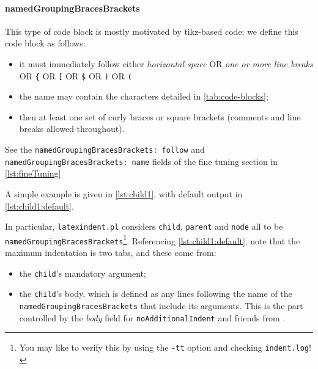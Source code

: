 	\paragraph{namedGroupingBracesBrackets}
		This type of code block is mostly motivated by tikz-based code; we define this code block
		as follows:
		\begin{itemize}
			\item it must immediately follow either \emph{horizontal space} OR \emph{one or more line breaks} OR
			      \lstinline!{! OR \lstinline![! OR \lstinline!$! OR
                  \lstinline!)! OR \lstinline!(!
			\item the name may contain the characters detailed in \vref{tab:code-blocks};
			\item then at least one set of curly braces or square brackets (comments and line breaks
			      allowed throughout).
		\end{itemize}
        See the \texttt{namedGroupingBracesBrackets: follow}  and \texttt{namedGroupingBracesBrackets: name} fields of the fine 
        tuning section in \vref{lst:fineTuning}

		A simple example is given in \cref{lst:child1}, with default output in
		\cref{lst:child1:default}.

		\begin{minipage}{.45\textwidth}
		\end{minipage}%
		\hfill
		\begin{minipage}{.5\textwidth}
		\end{minipage}%

		In particular, \texttt{latexindent.pl} considers \texttt{child},
		\texttt{parent} and \texttt{node} all to be
		\texttt{namedGroupingBracesBrackets}\footnote{
			You may like to verify this by using the \texttt{-tt} option and checking \texttt{indent.log}! }. Referencing \cref{lst:child1:default}, note
		that the maximum indentation is two tabs, and these come from:
		\begin{itemize}
			\item the \lstinline!child!'s mandatory argument;
			\item the \lstinline!child!'s body, which is defined as any lines following the name of
			      the \texttt{namedGroupingBracesBrackets} that include its arguments. This is the part controlled by the
			      \emph{body} field for \texttt{noAdditionalIndent} and friends from
			      .
		\end{itemize}

